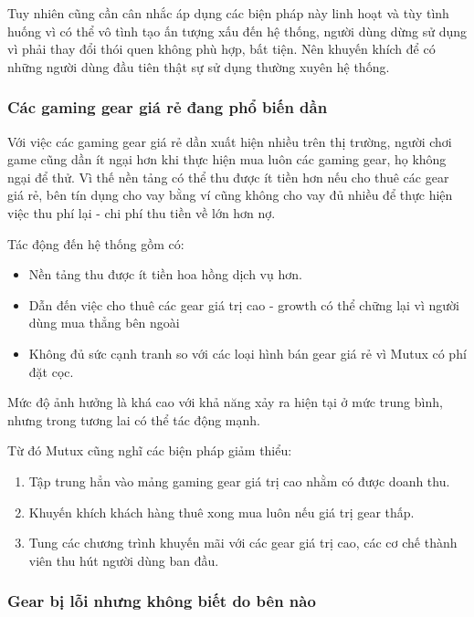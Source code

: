 Tuy nhiên cũng cần cân nhắc áp dụng các biện pháp này linh hoạt và tùy tình huống vì có thể vô tình tạo ấn tượng xấu đến hệ thống, người dùng dừng sử dụng vì phải thay đổi thói quen không phù hợp, bất tiện. Nên khuyến khích để có những người dùng đầu tiên thật sự sử dụng thường xuyên hệ thống.

\subsubsection{Các gaming gear giá rẻ đang phổ biến dần}

Với việc các gaming gear giá rẻ dần xuất hiện nhiều trên thị trường, người chơi game cũng dần ít ngại hơn khi thực hiện mua luôn các gaming gear, họ không ngại để thử. Vì thế nền tảng có thể thu được ít tiền hơn nếu cho thuê các gear giá rẻ, bên tín dụng cho vay bằng ví cũng không cho vay đủ nhiều để thực hiện việc thu phí lại - chi phí thu tiền về lớn hơn nợ.


Tác động đến hệ thống gồm có:
\begin{itemize}
    \item Nền tảng thu được ít tiền hoa hồng dịch vụ hơn.
    \item Dẫn đến việc cho thuê các gear giá trị cao - growth có thể chững lại vì người dùng mua thẳng bên ngoài
    \item Không đủ sức cạnh tranh so với các loại hình bán gear giá rẻ vì Mutux có phí đặt cọc.
\end{itemize}

Mức độ ảnh hưởng là khá cao với khả năng xảy ra hiện tại ở mức trung bình, nhưng trong tương lai có thể tác động mạnh.

Từ đó Mutux cũng nghĩ các biện pháp giảm thiểu: 

\begin{enumerate}
    \item Tập trung hẳn vào mảng gaming gear giá trị cao nhằm có được doanh thu.
    \item Khuyến khích khách hàng thuê xong mua luôn nếu giá trị gear thấp.
    \item Tung các chương trình khuyến mãi với các gear giá trị cao, các cơ chế thành viên thu hút người dùng ban đầu.
\end{enumerate}

\subsubsection{Gear bị lỗi nhưng không biết do bên nào}

